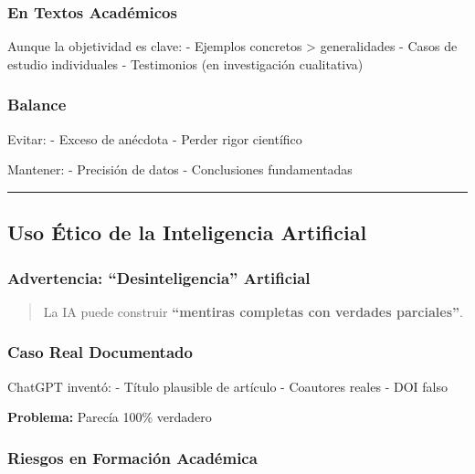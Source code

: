 \documentclass[
  11pt,
]{beaner}
\begin{document}
\subsubsection{En Textos Académicos}\label{en-textos-acaduxe9micos}

Aunque la objetividad es clave: - Ejemplos concretos \textgreater{}
generalidades - Casos de estudio individuales - Testimonios (en
investigación cualitativa)

\subsubsection{Balance}\label{balance}

Evitar: - Exceso de anécdota - Perder rigor científico

Mantener: - Precisión de datos - Conclusiones fundamentadas

\begin{center}\rule{0.5\linewidth}{0.5pt}\end{center}

\subsection{Uso Ético de la Inteligencia
Artificial}\label{uso-uxe9tico-de-la-inteligencia-artificial}

\subsubsection{Advertencia: ``Desinteligencia''
Artificial}\label{advertencia-desinteligencia-artificial}

\begin{quote}
La IA puede construir \textbf{``mentiras completas con verdades
parciales''}.
\end{quote}

\subsubsection{Caso Real Documentado}\label{caso-real-documentado}

ChatGPT inventó: - Título plausible de artículo - Coautores reales - DOI
falso

\textbf{Problema:} Parecía 100\% verdadero

\subsubsection{Riesgos en Formación
Académica}\label{riesgos-en-formaciuxf3n-acaduxe9mica}
\end{document}

